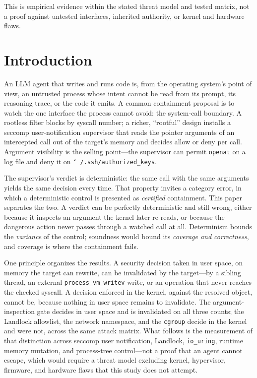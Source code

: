 \documentclass[11pt]{article}
\begin{document}
This is empirical evidence within the stated threat model and tested matrix, not a proof against untested
interfaces, inherited authority, or kernel and hardware flaws.

\section{Introduction}

An LLM agent that writes and runs code is, from the operating system's point of view, an
untrusted process whose intent cannot be read from its prompt, its reasoning trace, or the
code it emits. A common containment proposal is to watch the one interface the process
cannot avoid: the system-call boundary. A rootless filter blocks by syscall number; a
richer, ``rootful'' design installs a seccomp user-notification supervisor that reads the
pointer arguments of an intercepted call out of the target's memory and decides allow or
deny per call. Argument visibility is the selling point---the supervisor can permit
\texttt{openat} on a log file and deny it on \texttt{\char`~/.ssh/authorized\_keys}.

The supervisor's verdict is deterministic: the same call with the same arguments yields the
same decision every time. That property invites a category error, in which a deterministic
control is presented as \emph{certified} containment. This paper separates the two. A
verdict can be perfectly deterministic and still wrong, either because it inspects an
argument the kernel later re-reads, or because the dangerous action never passes through a
watched call at all. Determinism bounds the \emph{variance} of the control; soundness would
bound its \emph{coverage and correctness}, and coverage is where the containment fails.

One principle organizes the results. A security decision taken in user space, on memory the target can
rewrite, can be invalidated by the target---by a sibling thread, an external \texttt{process\_vm\_writev}
write, or an operation that never reaches the checked syscall. A decision enforced in the kernel, against
the resolved object, cannot be, because nothing in user space remains to invalidate. The
argument-inspection gate decides in user space and is invalidated on all three counts; the Landlock
allowlist, the network namespace, and the \texttt{cgroup} decide in the kernel and were not, across the
same attack matrix. What follows is the measurement of that distinction across seccomp user notification,
Landlock, \texttt{io\_uring}, runtime memory mutation, and process-tree control---not a proof that an
agent cannot escape, which would require a threat model excluding kernel, hypervisor, firmware, and
hardware flaws that this study does not attempt.
\end{document}
